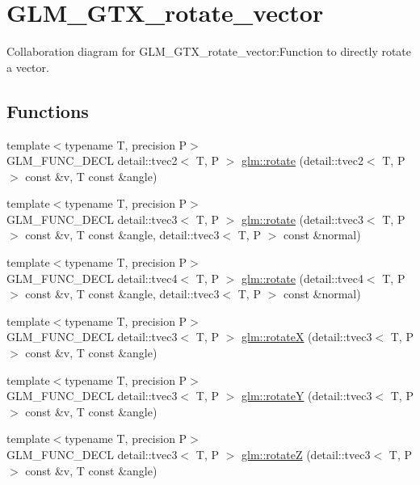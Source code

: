 \hypertarget{group__gtx__rotate__vector}{
\section{GLM\_\-GTX\_\-rotate\_\-vector}
\label{group__gtx__rotate__vector}
}


Collaboration diagram for GLM\_\-GTX\_\-rotate\_\-vector:Function to directly rotate a vector.  
\subsection*{Functions}
\begin{CompactItemize}
\item 
{\footnotesize template$<$typename T, precision P$>$ }\\GLM\_\-FUNC\_\-DECL detail::tvec2$<$ T, P $>$ \hyperlink{group__gtx__rotate__vector_gc1ec422e7ac679e3332b381e88d29dfd}{glm::rotate} (detail::tvec2$<$ T, P $>$ const \&v, T const \&angle)
\item 
{\footnotesize template$<$typename T, precision P$>$ }\\GLM\_\-FUNC\_\-DECL detail::tvec3$<$ T, P $>$ \hyperlink{group__gtx__rotate__vector_gf0809ae83e84fc9880b4c8b7093c349c}{glm::rotate} (detail::tvec3$<$ T, P $>$ const \&v, T const \&angle, detail::tvec3$<$ T, P $>$ const \&normal)
\item 
{\footnotesize template$<$typename T, precision P$>$ }\\GLM\_\-FUNC\_\-DECL detail::tvec4$<$ T, P $>$ \hyperlink{group__gtx__rotate__vector_ga787e2132208a47efe58640ac7de9509}{glm::rotate} (detail::tvec4$<$ T, P $>$ const \&v, T const \&angle, detail::tvec3$<$ T, P $>$ const \&normal)
\item 
{\footnotesize template$<$typename T, precision P$>$ }\\GLM\_\-FUNC\_\-DECL detail::tvec3$<$ T, P $>$ \hyperlink{group__gtx__rotate__vector_g29ccc284b661dc52c457959f8cbf8af6}{glm::rotateX} (detail::tvec3$<$ T, P $>$ const \&v, T const \&angle)
\item 
{\footnotesize template$<$typename T, precision P$>$ }\\GLM\_\-FUNC\_\-DECL detail::tvec3$<$ T, P $>$ \hyperlink{group__gtx__rotate__vector_g8e792cb7fbd2ad57a4eafcccc62c523c}{glm::rotateY} (detail::tvec3$<$ T, P $>$ const \&v, T const \&angle)
\item 
{\footnotesize template$<$typename T, precision P$>$ }\\GLM\_\-FUNC\_\-DECL detail::tvec3$<$ T, P $>$ \hyperlink{group__gtx__rotate__vector_g67b56c3da73e7da777810b2a82bab4f8}{glm::rotateZ} (detail::tvec3$<$ T, P $>$ const \&v, T const \&angle)

\end{CompactItemize}
